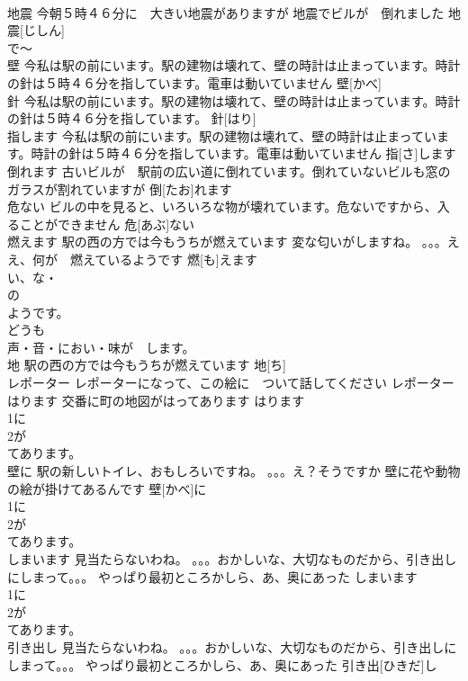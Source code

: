 \documentclass[8pt]{extreport}
\begin{document}
\begin{CJK}{UTF8}{min}
\\	地震	今朝５時４６分に　大きい地震がありますが 地震でビルが　倒れました	地震[じしん]				
\\	で～
\\	壁	今私は駅の前にいます。駅の建物は壊れて、壁の時計は止まっています。時計の針は５時４６分を指しています。電車は動いていません	壁[かべ]					
\\	針	今私は駅の前にいます。駅の建物は壊れて、壁の時計は止まっています。時計の針は５時４６分を指しています。	針[はり]			
\\	指します	今私は駅の前にいます。駅の建物は壊れて、壁の時計は止まっています。時計の針は５時４６分を指しています。電車は動いていません	指[さ]します			
\\	倒れます	古いビルが　駅前の広い道に倒れています。倒れていないビルも窓のガラスが割れていますが	倒[たお]れます					
\\	危ない	ビルの中を見ると、いろいろな物が壊れています。危ないですから、入ることができません	危[あぶ]ない					
\\	燃えます	駅の西の方では今もうちが燃えています 変な匂いがしますね。 。。。ええ、何が　燃えているようです	燃[も]えます			
\\	い、な・
\\	の
\\	ようです。
\\	どうも
\\	声・音・におい・味が　します。
\\	地	駅の西の方では今もうちが燃えています	地[ち]					
\\	レポーター	レポーターになって、この絵に　ついて話してください	レポーター					
\\	はります	交番に町の地図がはってあります	はります			
\\	1に
\\	2が
\\	てあります。
\\	壁に	駅の新しいトイレ、おもしろいですね。 。。。え？そうですか 壁に花や動物の絵が掛けてあるんです	壁[かべ]に				
\\	1に
\\	2が
\\	てあります。
\\	しまいます	見当たらないわね。 。。。おかしいな、大切なものだから、引き出しにしまって。。。 やっぱり最初ところかしら、あ、奥にあった	しまいます			
\\	1に
\\	2が
\\	てあります。
\\	引き出し	見当たらないわね。 。。。おかしいな、大切なものだから、引き出しにしまって。。。 やっぱり最初ところかしら、あ、奥にあった	引き出[ひきだ]し				

\end{CJK}
\end{document}
